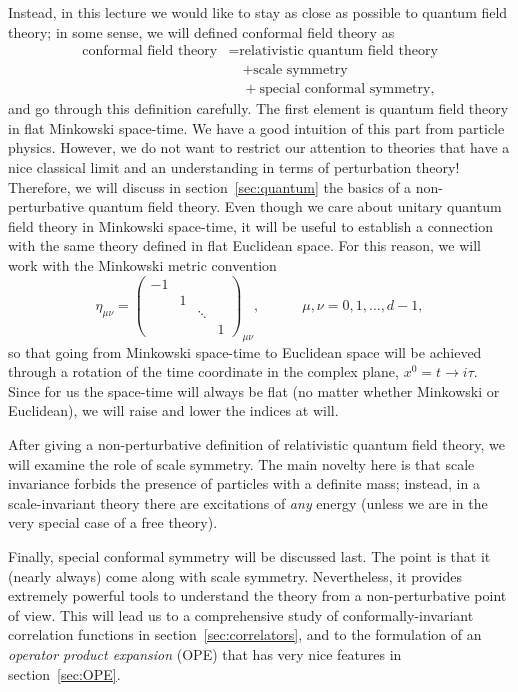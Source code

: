 \documentclass[a4paper,12pt]{article}
\numberwithin{equation}{section}
\begin{document}
Instead, in this lecture we would like to stay as close as possible to quantum field theory; in some sense, we will defined conformal field theory as
\begin{equation}
\begin{aligned}
	\text{conformal field theory}
	&= \text{relativistic quantum field theory} 
	\\
	& \quad
	+ \text{scale symmetry}
	\\
	& \quad
	+ \text{special conformal symmetry},
\end{aligned}
\end{equation}
and go through this definition carefully.
The first element is quantum field theory in flat Minkowski space-time. We have a good intuition of this part from particle physics. However, we do not want to restrict our attention to theories that have a nice classical limit and an understanding in terms of perturbation theory!
Therefore, we will discuss in section~\ref{sec:quantum} the basics of a non-perturbative quantum field theory.
Even though we care about unitary quantum field theory in Minkowski space-time, it will be useful to establish a connection with the same theory defined in flat Euclidean space. For this reason, we will work with the Minkowski metric convention
\begin{equation}
	\eta_{\mu\nu} = \left( \begin{array}{cccc}
		-1 &&& \\ & 1 && \\ && \ddots & \\ &&& 1
	\end{array} \right)_{\mu\nu},
	\qquad\quad
	\mu, \nu = 0, 1, \ldots, d-1,
\end{equation}
so that going from Minkowski space-time to Euclidean space will be achieved through a rotation of the time coordinate in the complex plane, $x^0 = t \to i \tau$.
Since for us the space-time will always be flat (no matter whether Minkowski or Euclidean), we will raise and lower the indices at will.

After giving a non-perturbative definition of relativistic quantum field theory, we will examine the role of scale symmetry. The main novelty here is that scale invariance forbids the presence of particles with a definite mass; instead, in a scale-invariant theory there are excitations of \emph{any} energy (unless we are in the very special case of a free theory).

Finally, special conformal symmetry will be discussed last. The point is that it (nearly always) come along with scale symmetry. Nevertheless, it provides extremely powerful tools to understand the theory from a non-perturbative point of view. This will lead us to a comprehensive study of conformally-invariant correlation functions in section~\ref{sec:correlators}, and to the formulation of an \emph{operator product expansion} (OPE) that has very nice features in section~\ref{sec:OPE}.
\end{document}
